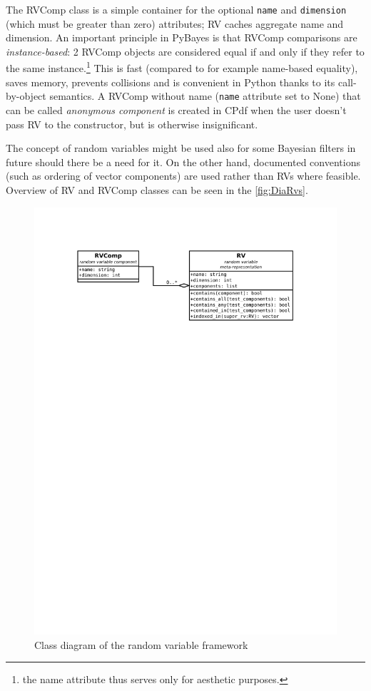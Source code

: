 The RVComp class is a simple container for the optional \verb|name| and \verb|dimension| (which must
be greater than zero) attributes; RV caches aggregate name and dimension. An important principle in
PyBayes is that RVComp comparisons are \emph{instance-based}: 2 RVComp objects are considered equal
if and only if they refer to the same instance.\footnote{the name attribute thus serves only for
aesthetic purposes.} This is fast (compared to for example name-based equality), saves memory,
prevents collisions and is convenient in Python thanks to its call-by-object semantics. A RVComp
without name (\verb|name| attribute set to None) that can be called \emph{anonymous component} is
created in CPdf when the user doesn't pass RV to the constructor, but is otherwise insignificant.

The concept of random variables might be used also for some Bayesian filters in future should there
be a need for it. On the other hand, documented conventions (such as ordering of vector components)
are used rather than RVs where feasible. Overview of RV and RVComp classes can be seen in the
\autoref{fig:DiaRvs}.

\begin{figure}[h]
	\centering
	\includegraphics[width=\textwidth,keepaspectratio=true,clip=true,trim=3cm 218mm 3cm 3cm]{./diagrams/rvs.pdf}
	\vspace{-8mm}
	\caption{Class diagram of the random variable framework}
	\label{fig:DiaRvs}
\end{figure}

